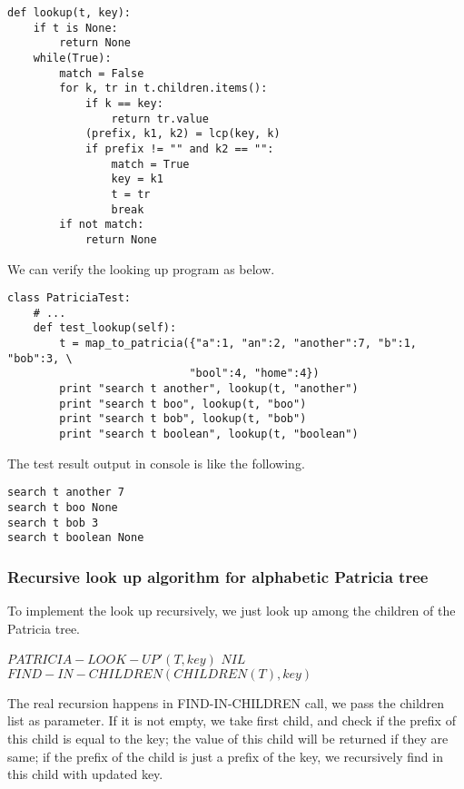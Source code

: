 \documentclass{article}
\begin{document}
\lstset{language=Python}
\begin{lstlisting}
def lookup(t, key):
    if t is None:
        return None
    while(True):
        match = False
        for k, tr in t.children.items():
            if k == key:
                return tr.value
            (prefix, k1, k2) = lcp(key, k)
            if prefix != "" and k2 == "":
                match = True
                key = k1
                t = tr
                break
        if not match:
            return None
\end{lstlisting}

We can verify the looking up program as below.

\begin{lstlisting}
class PatriciaTest:
    # ...
    def test_lookup(self):
        t = map_to_patricia({"a":1, "an":2, "another":7, "b":1, "bob":3, \
                            "bool":4, "home":4})
        print "search t another", lookup(t, "another")
        print "search t boo", lookup(t, "boo")
        print "search t bob", lookup(t, "bob")
        print "search t boolean", lookup(t, "boolean")
\end{lstlisting}

The test result output in console is like the following.

\begin{verbatim}
search t another 7
search t boo None
search t bob 3
search t boolean None
\end{verbatim}

\subsubsection{Recursive look up algorithm for alphabetic Patricia
tree}

To implement the look up recursively, we just look up among the children
of the Patricia tree.

\begin{algorithmic}
\STATE $PATRICIA-LOOK-UP'(T, key)$
    \RETURN $NIL$ 
  \ELSE
    \RETURN $FIND-IN-CHILDREN(CHILDREN(T), key)$
  \ENDIF
\end{algorithmic}

The real recursion happens in FIND-IN-CHILDREN call, we pass the
children list as parameter. If it is not empty, we take first child,
and check if the prefix of this child is equal to the key; the value
of this child will be returned if they are same; if the prefix of the
child is just a prefix of the key, we recursively find in this child
with updated key.
\end{document}
